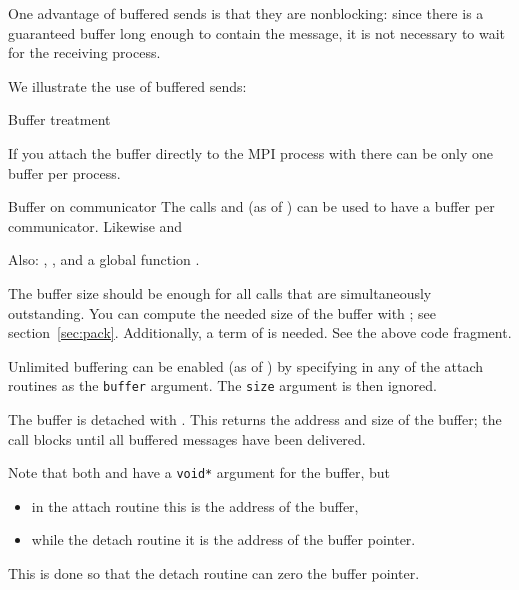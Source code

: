 One advantage of buffered sends is that they are nonblocking:
since there is a guaranteed buffer long enough to contain the
message, it is not necessary to wait for the receiving process.

We illustrate the use of buffered sends:


 {Buffer treatment}

If you attach the buffer directly to the MPI process
with 
there can be only one buffer per process.

\begin{mpifournote}{Buffer on communicator}
  The calls 
  and 
  (as of )
  can be used to have a buffer per communicator.
  Likewise 
  and 

  Also: , ,
  and a global function .
\end{mpifournote}

The buffer size should be enough
for all  calls that are simultaneously
outstanding.
You can compute the needed size of the buffer with ;
see section~\ref{sec:pack}.
Additionally, a term of  is needed.
See the above code fragment.

\begin{mpifournote}
  Unlimited buffering can be enabled (as of ) by
  specifying 
  in any of the attach routines as the \lstinline{buffer} argument.
  The \lstinline{size} argument is then ignored.
\end{mpifournote}

The buffer is detached with .
This returns the address and size of the buffer; the call blocks
until all buffered messages have been delivered.

Note that both
 and 
have a \lstinline+void*+ argument for the buffer, but 
\begin{itemize}
\item in the attach routine this is the address of the buffer,
\item while the detach routine it is the address of the buffer pointer.
\end{itemize}
This is done so that the detach routine can zero the buffer pointer.

